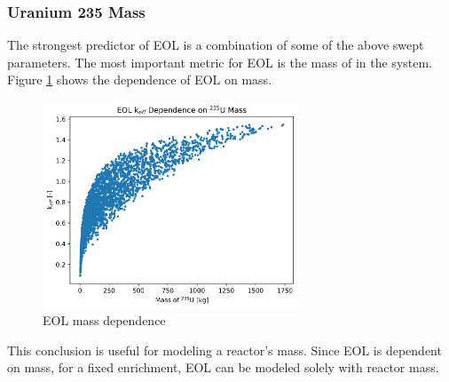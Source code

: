 \subsubsection{Uranium 235 Mass}
The strongest predictor of EOL \keff is a combination of some of the above
swept parameters. The most important metric for EOL \keff is the mass of \uran
in the system. Figure \ref{fig:eol_keff_vs_235_mass} shows the dependence of EOL
\keff on \uran mass.

\begin{figure}[h]
    \centering
    \includegraphics[width=3in]{../images/keff_vs_mass_235.png}
\caption{EOL \keff \uran mass dependence}
\label{fig:eol_keff_vs_235_mass}
\end{figure}

This conclusion is useful for modeling a reactor's mass. Since EOL \keff is
dependent on \uran mass, for a fixed enrichment, EOL \keff can be modeled 
solely with reactor mass.


